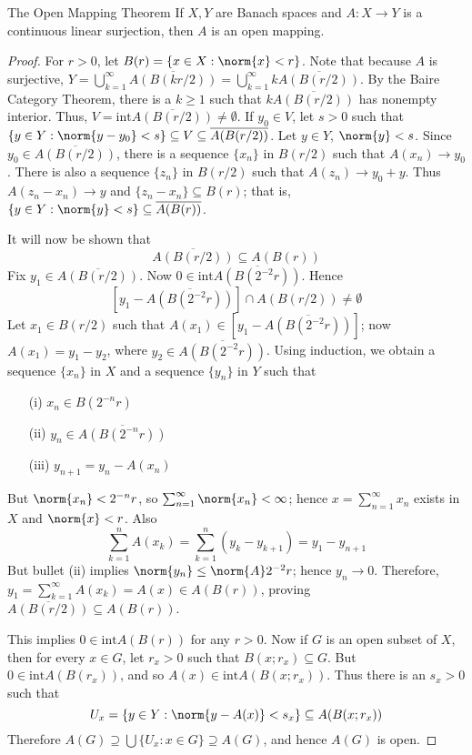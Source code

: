 \begin{nthm}{The Open Mapping Theorem}
    If $X,Y$ are Banach spaces and $A:X\rightarrow Y$ is a continuous linear surjection, then $A$ is an open mapping.
\end{nthm}
\begin{proof}
    For $r > 0$, let $B(r) = \{x \in X:\norm{x} < r\}$. Note that because $A$ is surjective, $Y = \bigcup_{k=1}^{\infty}\overline{A(B(kr/2))} = \bigcup_{k=1}^{\infty}k\overline{A(B(r/2))}$. By the Baire Category Theorem, there is a $k \geq 1$ such that $k\overline{A(B(r/2))}$ has nonempty interior. Thus, $V = \text{int}\overline{A(B(r/2))} \neq \emptyset$. If $y_0 \in V$, let $s > 0$ such that $\{y \in Y:\norm{y-y_0} < s\} \subseteq V\subseteq \overline{A(B(r/2))}$. Let $y \in Y$, $\norm{y} < s$. Since $y_0 \in \overline{A(B(r/2))}$, there is a sequence $\{x_n\}$ in $B(r/2)$ such that $A(x_n)\rightarrow y_0$. There is also a sequence $\{z_n\}$ in $B(r/2)$ such that $A(z_n)\rightarrow y_0+y$. Thus $A(z_n-x_n)\rightarrow y$ and $\{z_n-x_n\}\subseteq B(r)$; that is, $\{y \in Y:\norm{y} < s\} \subseteq \overline{A(B(r))}$. 

    It will now be shown that $$\overline{A(B(r/2))} \subseteq A(B(r))$$
    Fix $y_1 \in \overline{A(B(r/2))}$. Now $0 \in \text{int}\overline{A(B(2^{-2}r))}$. Hence $$[y_1-\overline{A(B(2^{-2}r))}]\cap A(B(r/2)) \neq \emptyset$$
    Let $x_1 \in B(r/2)$ such that $A(x_1) \in [y_1 - \overline{A(B(2^{-2}r))}]$; now $A(x_1) = y_1-y_2$, where $y_2 \in \overline{A(B(2^{-2}r))}$. Using induction, we obtain a sequence $\{x_n\}$ in $X$ and a sequence $\{y_n\}$ in $Y$ such that \begin{enumerate}
        \item[(i)] $x_n \in B(2^{-n}r)$
        \item[(ii)] $y_n \in \overline{A(B(2^{-n}r))}$
        \item[(iii)] $y_{n+1} = y_n -A(x_n)$
    \end{enumerate}
    But $\norm{x_n} < 2^{-n}r$, so $\sum_{n=1}^{\infty}\norm{x_n} < \infty$; hence $x = \sum_{n=1}^{\infty}x_n$ exists in $X$ and $\norm{x} < r$. Also $$\sum_{k=1}^nA(x_k) = \sum_{k=1}^n(y_k-y_{k+1}) = y_1-y_{n+1}$$
    But bullet (ii) implies $\norm{y_n} \leq \norm{A}2^{-2}r$; hence $y_n\rightarrow 0$. Therefore, $y_1 = \sum_{k=1}^{\infty}A(x_k) = A(x) \in A(B(r))$, proving $\overline{A(B(r/2))} \subseteq A(B(r))$.

    This implies $0 \in \text{int}A(B(r))$ for any $r > 0$. Now if $G$ is an open subset of $X$, then for every $x \in G$, let $r_x > 0$ such that $B(x;r_x) \subseteq G$. But $0 \in \text{int}A(B(r_x))$, and so $A(x) \in \text{int}A(B(x;r_x))$. Thus there is an $s_x > 0$ such that $$U_x = \{y \in Y:\norm{y-A(x)} < s_x\} \subseteq A(B(x;r_x))$$
    Therefore $A(G) \supseteq \bigcup\{U_x:x \in G\} \supseteq A(G)$, and hence $A(G)$ is open.
\end{proof}


